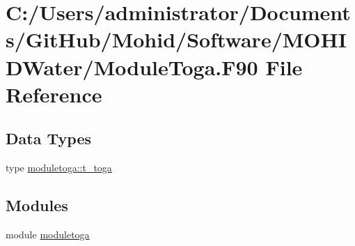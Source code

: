 \hypertarget{_module_toga_8_f90}{}\section{C\+:/\+Users/administrator/\+Documents/\+Git\+Hub/\+Mohid/\+Software/\+M\+O\+H\+I\+D\+Water/\+Module\+Toga.F90 File Reference}
\label{_module_toga_8_f90}
\subsection*{Data Types}
\begin{DoxyCompactItemize}
\item 
type \mbox{\hyperlink{structmoduletoga_1_1t__toga}{moduletoga\+::t\+\_\+toga}}
\end{DoxyCompactItemize}
\subsection*{Modules}
\begin{DoxyCompactItemize}
\item 
module \mbox{\hyperlink{namespacemoduletoga}{moduletoga}}
\end{DoxyCompactItemize}
